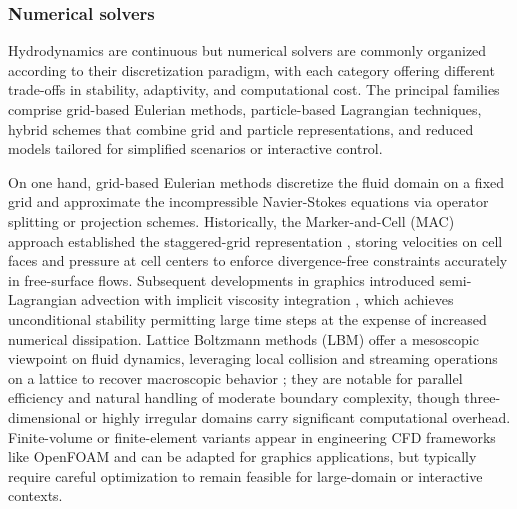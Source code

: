 

\subsubsection{Numerical solvers}

Hydrodynamics are continuous but numerical solvers are commonly organized according to their discretization paradigm, with each category offering different trade-offs in stability, adaptivity, and computational cost. The principal families comprise grid-based Eulerian methods, particle-based Lagrangian techniques, hybrid schemes that combine grid and particle representations, and reduced models tailored for simplified scenarios or interactive control.

On one hand, grid-based Eulerian methods discretize the fluid domain on a fixed grid and approximate the incompressible Navier-Stokes equations via operator splitting or projection schemes. Historically, the Marker-and-Cell (MAC) approach established the staggered-grid representation \cite{Harlow1965}, storing velocities on cell faces and pressure at cell centers to enforce divergence-free constraints accurately in free-surface flows. Subsequent developments in graphics introduced semi-Lagrangian advection with implicit viscosity integration \cite{Stam1999}, which achieves unconditional stability permitting large time steps at the expense of increased numerical dissipation. Lattice Boltzmann methods (LBM) offer a mesoscopic viewpoint on fluid dynamics, leveraging local collision and streaming operations on a lattice to recover macroscopic behavior \cite{Chen1998}; they are notable for parallel efficiency and natural handling of moderate boundary complexity, though three-dimensional or highly irregular domains carry significant computational overhead. Finite-volume or finite-element variants appear in engineering CFD frameworks like OpenFOAM and can be adapted for graphics applications, but typically require careful optimization to remain feasible for large-domain or interactive contexts. %

